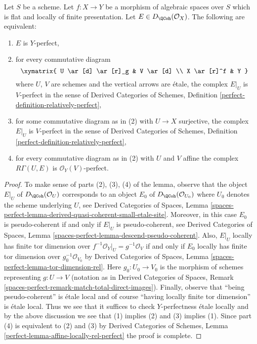 \begin{lemma}
\label{lemma-affine-locally-rel-perfect}
Let $S$ be a scheme. Let $f : X \to Y$ be a morphism of algebraic spaces
over $S$ which is flat and locally of finite presentation.
Let $E \in D_\QCoh(\mathcal{O}_X)$. The following are equivalent:
\begin{enumerate}
\item $E$ is $Y$-perfect,
\item for every commutative diagram
$$
\xymatrix{
U \ar[d] \ar[r]_g & V \ar[d] \\
X \ar[r]^f & Y
}
$$
where $U$, $V$ are schemes and the vertical arrows are \'etale, the complex
$E|_U$ is $V$-perfect in the sense of Derived Categories of Schemes,
Definition \ref{perfect-definition-relatively-perfect},
\item for some commutative diagram as in (2) with $U \to X$
surjective, the complex $E|_U$ is $V$-perfect in the sense of
Derived Categories of Schemes,
Definition \ref{perfect-definition-relatively-perfect},
\item for every commutative diagram as in (2) with $U$ and $V$
affine the complex $R\Gamma(U, E)$ is $\mathcal{O}_Y(V)$-perfect.
\end{enumerate}
\end{lemma}

\begin{proof}
To make sense of parts (2), (3), (4) of the lemma, observe that
the object $E|_U$ of $D_\QCoh(\mathcal{O}_U)$ corresponds to
an object $E_0$ of $D_\QCoh(\mathcal{O}_{U_0})$ where $U_0$
denotes the scheme underlying $U$, see Derived Categories of Spaces,
Lemma \ref{spaces-perfect-lemma-derived-quasi-coherent-small-etale-site}.
Moreover, in this case $E_0$ is pseudo-coherent if and only if
$E|_U$ is pseudo-coherent, see Derived Categories of Spaces,
Lemma \ref{spaces-perfect-lemma-descend-pseudo-coherent}.
Also, $E|_U$ locally has finite tor dimension over
$f^{-1}\mathcal{O}_Y|_U = g^{-1}\mathcal{O}_V$ if and only if
$E_0$ locally has finite tor dimension over $g_0^{-1}\mathcal{O}_{V_0}$
by Derived Categories of Spaces, Lemma
\ref{spaces-perfect-lemma-tor-dimension-rel}.
Here $g_0 : U_0 \to V_0$ is the morphism of schemes representing
$g : U \to V$ (notation as in Derived Categories of Spaces,
Remark \ref{spaces-perfect-remark-match-total-direct-images}).
Finally, observe that ``being pseudo-coherent'' is \'etale local and
of course ``having locally finite tor dimension'' is \'etale local.
Thus we see that it suffices to check $Y$-perfectness \'etale locally
and by the above discussion we see that (1) implies (2) and
(3) implies (1). Since part (4) is equivalent
to (2) and (3) by
Derived Categories of Schemes, Lemma
\ref{perfect-lemma-affine-locally-rel-perfect}
the proof is complete.
\end{proof}

